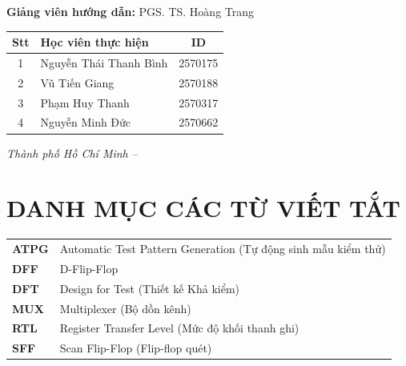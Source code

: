 \documentclass[12pt,a4paper]{article}
\begin{document}
\begin{titlepage}
    \vspace{0.3cm}
    
    {\fontsize{13}{16}\selectfont \textbf{Giảng viên hướng dẫn:} PGS. TS. Hoàng Trang}
    
    \vspace{0.8cm}
    
    \begin{center}
    \renewcommand{\arraystretch}{1.2}
    \fontsize{11}{13}\selectfont
    \begin{tabular}{|c|l|c|}
        \hline
        \textbf{Stt} & \textbf{Học viên thực hiện} & \textbf{ID} \\
        \hline
        1 & Nguyễn Thái Thanh Bình & 2570175 \\
        \hline
        2 & Vũ Tiến Giang & 2570188 \\
        \hline
        3 & Phạm Huy Thanh & 2570317 \\
        \hline
        4 & Nguyễn Minh Đức & 2570662 \\
        \hline
    \end{tabular}
    \end{center}
    
    \vfill
    
    {\fontsize{13}{16}\selectfont \textit{Thành phố Hồ Chí Minh -- \the\year}}
    
    \vspace{0.5cm}
    
    \restoregeometry
\end{titlepage}

\newpage
\section*{DANH MỤC CÁC TỪ VIẾT TẮT}

\begin{tabular}{l l}
    \textbf{ATPG} & Automatic Test Pattern Generation (Tự động sinh mẫu kiểm thử) \\
    \textbf{DFF} & D-Flip-Flop \\
    \textbf{DFT} & Design for Test (Thiết kế Khả kiểm) \\
    \textbf{MUX} & Multiplexer (Bộ dồn kênh) \\
    \textbf{RTL} & Register Transfer Level (Mức độ khối thanh ghi) \\
    \textbf{SFF} & Scan Flip-Flop (Flip-flop quét) \\
\end{tabular}
\end{document}
